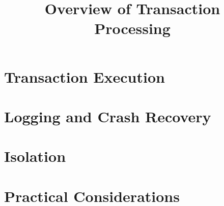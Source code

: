 \documentclass[xcolor={usenames,dvipsnames}
 	,handout
]{beamer}
\title{Overview of Transaction Processing}
\begin{document}
\frame{\maketitle}



\section{Transaction Execution}


\section{Logging and Crash Recovery}


\section{Isolation}


\section{Practical Considerations}

\end{document}
